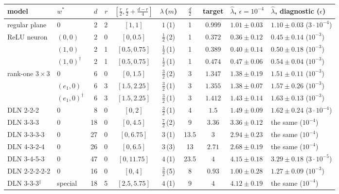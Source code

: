 \begin{refsection}
\begin{table}[t]
\begin{fullwidth}
\centering\footnotesize\setlength{\tabcolsep}{4.2pt}
\begin{tabular}{@{}llrrccccll@{}}
\toprule
model & $w^*$ & $d$ & $r$ & $[\tfrac r2,\tfrac r2+\tfrac{d-r}4]$ & $\lambda$\,($m$) & $\tfrac d2$ & target & $\hat\lambda$, $\epsilon=10^{-4}$ & $\hat\lambda$, diagnostic ($\epsilon$)\\
\midrule
regular plane & $0$ & 2 & 2 & $[1,1]$ & $1$\,(1) & 1 & $0.999$ & $1.01\pm0.03$ & $1.10\pm0.03$ ($3\cdot10^{-4}$)\\
ReLU neuron & $(0,0)$ & 2 & 0 & $[0,0.5]$ & $\tfrac12$\,(2) & 1 & $0.372$ & $0.36\pm0.12$ & $0.45\pm0.14$ ($10^{-3}$)\\
 & $(1,0)$ & 2 & 1 & $[0.5,0.75]$ & $\tfrac12$\,(1) & 1 & $0.389$ & $0.40\pm0.14$ & $0.50\pm0.18$ ($10^{-3}$)\\
 & $(1,0)^\dagger$ & 2 & 1 & $[0.5,0.75]$ & $\tfrac12$\,(1) & 1 & $0.474$ & $0.47\pm0.06$ & $0.54\pm0.04$ ($10^{-3}$)\\
rank-one $3\times3$ & $0$ & 6 & 0 & $[0,1.5]$ & $\tfrac32$\,(2) & 3 & $1.347$ & $1.38\pm0.19$ & $1.51\pm0.11$ ($10^{-3}$)\\
 & $(e_1,0)$ & 6 & 3 & $[1.5,2.25]$ & $\tfrac32$\,(1) & 3 & $1.355$ & $1.38\pm0.07$ & $1.57\pm0.26$ ($10^{-3}$)\\
 & $(e_1,0)^\dagger$ & 6 & 3 & $[1.5,2.25]$ & $\tfrac32$\,(1) & 3 & $1.412$ & $1.43\pm0.14$ & $1.63\pm0.13$ ($10^{-3}$)\\
DLN 2-2-2 & $0$ & 8 & 0 & $[0,2]$ & $\tfrac32$\,(1) & 4 & $1.5$ & $1.49\pm0.09$ & $1.62\pm0.24$ ($3\cdot10^{-4}$)\\
DLN 3-3-3 & $0$ & 18 & 0 & $[0,4.5]$ & $\tfrac72$\,(2) & 9 & $3.36$ & $3.36\pm0.12$ & the same ($10^{-4}$)\\
DLN 3-3-3-3 & $0$ & 27 & 0 & $[0,6.75]$ & $3$\,(1) & 13.5 & $3$ & $2.94\pm0.23$ & the same ($10^{-4}$)\\
DLN 4-3-2-4 & $0$ & 26 & 0 & $[0,6.5]$ & $3$\,(3) & 13 & $2.71$ & $2.68\pm0.19$ & the same ($10^{-4}$)\\
DLN 3-4-5-3 & $0$ & 47 & 0 & $[0,11.75]$ & $4$\,(1) & 23.5 & $4$ & $4.15\pm0.18$ & $3.29\pm0.18$ ($3\cdot10^{-5}$)\\
DLN 2-2-2-2-2 & $0$ & 16 & 0 & $[0,4]$ & $\tfrac32$\,(5) & 8 & $0.93$ & $1.00\pm0.28$ & $1.27\pm0.09$ ($10^{-3}$)\\
DLN 3-3-3$^\ddagger$ & special & 18 & 5 & $[2.5,5.75]$ & $4$\,(1) & 9 & $4$ & $4.12\pm0.19$ & the same ($10^{-4}$)\\

\end{tabular}
\end{fullwidth}
\end{table}
\end{refsection}
